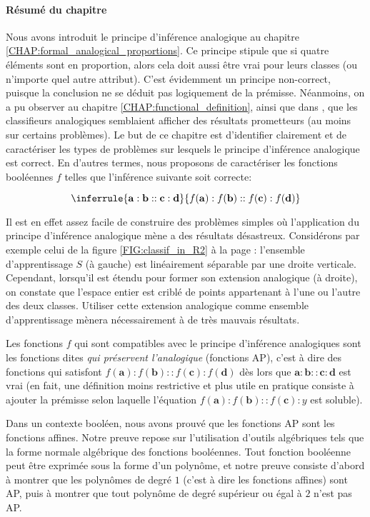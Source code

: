 \paragraph{Résumé du chapitre}

Nous avons introduit le principe d'inférence analogique au chapitre
\ref{CHAP:formal_analogical_proportions}. Ce principe stipule que si quatre
éléments sont en proportion, alors cela doit aussi être vrai pour leurs classes
(ou n'importe quel autre attribut). C'est évidemment un principe non-correct,
puisque la conclusion ne se déduit pas logiquement de la prémisse. Néanmoins,
on a pu observer au chapitre \ref{CHAP:functional_definition}, ainsi que dans
\cite{BayMicDelIJCAI07}, que les classifieurs analogiques semblaient afficher
des résultats prometteurs (au moins sur certains problèmes). Le but de ce
chapitre est d'identifier clairement et de caractériser les types de problèmes
sur lesquels le principe d'inférence analogique est correct. En d'autres
termes, nous proposons de caractériser les fonctions booléennes $f$ telles que
l'inférence suivante soit correcte:

$$
\inferrule{\mathbf{a} : \mathbf{b} :: \mathbf{c} : \mathbf{d}}{ f(\mathbf{a}) :
f(\mathbf{b}) :: f(\mathbf{c}) : f(\mathbf{d})}
$$

Il est en effet assez facile de construire des problèmes simples où
l'application du principe d'inférence analogique mène a des résultats
désastreux. Considérons par exemple celui de la figure \ref{FIG:classif_in_R2}
à la page \pageref{FIG:classif_in_R2}:
l'ensemble d'apprentissage $S$ (à gauche) est linéairement séparable par une
droite verticale. Cependant, lorsqu'il est étendu pour former son extension
analogique (à droite), on constate que l'espace entier est criblé de points
appartenant à l'une ou l'autre des deux classes. Utiliser cette extension
analogique comme ensemble d'apprentissage mènera nécessairement à de très
mauvais résultats.

Les fonctions $f$ qui sont compatibles avec le principe d'inférence analogiques
sont les fonctions dites \textit{qui préservent l'analogique} (fonctions AP),
c'est à dire des fonctions qui satisfont $f(\mathbf{a}) :f(\mathbf{b})::
f(\mathbf{c}): f(\mathbf{d})$  dès lors que
$\mathbf{a}:\mathbf{b}::\mathbf{c}:\mathbf{d}$ est vrai (en fait, une
définition moins restrictive et plus utile en pratique consiste à ajouter la
prémisse selon laquelle l'équation $f(\mathbf{a}) :f(\mathbf{b}):: f(\mathbf{c}):y$ est
soluble).


Dans un contexte booléen, nous avons prouvé que les fonctions AP sont les
fonctions affines. Notre preuve repose sur l'utilisation d'outils algébriques
tels que la forme normale algébrique des fonctions booléennes. Tout fonction
booléenne peut être exprimée sous la forme d'un polynôme, et notre preuve
consiste d'abord  à montrer que les polynômes de degré $1$ (c'est à dire les
fonctions affines) sont AP, puis à montrer que tout polynôme de degré supérieur
ou égal à $2$ n'est pas AP.

